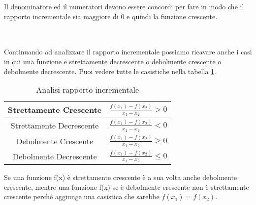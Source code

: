 \begin{note}
    Il denominatore ed il numeratori devono essere concordi per fare in modo che il rapporto incrementale sia maggiore di 0 e quindi la funzione crescente. \\ \\\\
\end{note}
Continuando ad analizzare il rapporto incrementale possiamo ricavare anche i casi in cui una funzione e strettamente decrescente o debolmente crescente o debolmente decrescente. Puoi vedere tutte le casistiche nella tabella \ref{tab:analisi-rapporto-incrementale}.
\begin{table}[h!]
    \centering
    \setlength{\tabcolsep}{7pt}
    \renewcommand{\arraystretch}{2}
    \begin{tabular}{|c|c|}
        \hline
        Strettamente Crescente & $\frac{f(x_1) - f(x_2)}{x_1 - x_2} > 0$\\ \hline
        Strettamente Decrescente & $\frac{f(x_1) - f(x_2)}{x_1 - x_2} < 0$ \\ \hline
        Debolmente Crescente & $\frac{f(x_1) - f(x_2)}{x_1 - x_2} \geq 0$ \\ \hline
        Debolmente Decrescente & $\frac{f(x_1) - f(x_2)}{x_1 - x_2} \leq 0$ \\ \hline
    \end{tabular}
    \caption{Analisi rapporto incrementale}
    \label{tab:analisi-rapporto-incrementale}
\end{table}
\begin{observation}
    Se una funzione f(x) è strettamente crescente è a sua volta anche debolmente crescente, mentre una funzione f(x) se è debolmente crescente non è strettamente crescente perché aggiunge una casistica che sarebbe $f(x_1) = f(x_2)$. 
\end{observation}
